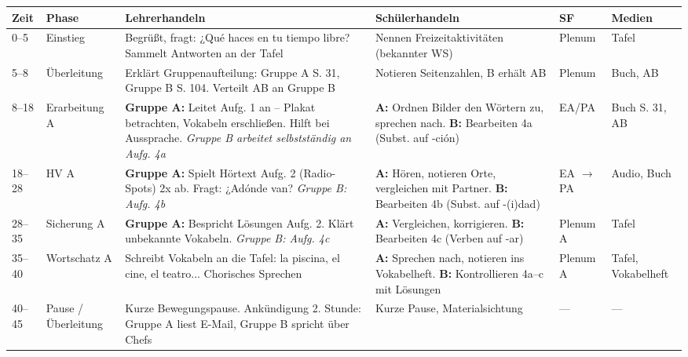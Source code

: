 \documentclass[11pt,a4paper]{article}
\begin{document}
\begin{longtable}{|p{1cm}|p{1.5cm}|p{3.8cm}|p{3.2cm}|p{1.5cm}|p{2cm}|}
\hline
\textbf{Zeit} & \textbf{Phase} & \textbf{Lehrerhandeln} & \textbf{Schülerhandeln} & \textbf{SF} & \textbf{Medien} \\
\hline
\endhead

0--5 & Einstieg & Begrüßt, fragt: ¿Qué haces en tu tiempo libre? Sammelt Antworten an der Tafel & Nennen Freizeitaktivitäten (bekannter WS) & Plenum & Tafel \\
\hline

5--8 & Über\-leitung & Erklärt Gruppenaufteilung: Gruppe A S. 31, Gruppe B S. 104. Verteilt AB an Gruppe B & Notieren Seitenzahlen, B erhält AB & Plenum & Buch, AB \\
\hline

8--18 & Erarbei\-tung A & \textbf{Gruppe A:} Leitet Aufg. 1 an -- Plakat betrachten, Vokabeln erschließen. Hilft bei Aussprache. \newline \textit{Gruppe B arbeitet selbstständig an Aufg. 4a} & \textbf{A:} Ordnen Bilder den Wörtern zu, sprechen nach. \newline \textbf{B:} Bearbeiten 4a (Subst. auf -ción) & EA/PA & Buch S. 31, AB \\
\hline

18--28 & HV A & \textbf{Gruppe A:} Spielt Hörtext Aufg. 2 (Radio-Spots) 2x ab. Fragt: ¿Adónde van? \newline \textit{Gruppe B: Aufg. 4b} & \textbf{A:} Hören, notieren Orte, vergleichen mit Partner. \newline \textbf{B:} Bearbeiten 4b (Subst. auf -(i)dad) & EA $\rightarrow$ PA & Audio, Buch \\
\hline

28--35 & Sicherung A & \textbf{Gruppe A:} Bespricht Lösungen Aufg. 2. Klärt unbekannte Vokabeln. \newline \textit{Gruppe B: Aufg. 4c} & \textbf{A:} Vergleichen, korrigieren. \newline \textbf{B:} Bearbeiten 4c (Verben auf -ar) & Plenum A & Tafel \\
\hline

35--40 & Wort\-schatz A & Schreibt Vokabeln an die Tafel: la piscina, el cine, el teatro... Chorisches Sprechen & \textbf{A:} Sprechen nach, notieren ins Vokabelheft. \newline \textbf{B:} Kontrollieren 4a--c mit Lösungen & Plenum A & Tafel, Vokabelheft \\
\hline

40--45 & Pause / Über\-leitung & Kurze Bewegungspause. Ankündigung 2. Stunde: Gruppe A liest E-Mail, Gruppe B spricht über Chefs & Kurze Pause, Materialsichtung & --- & --- \\
\hline
\end{longtable}
\end{document}
